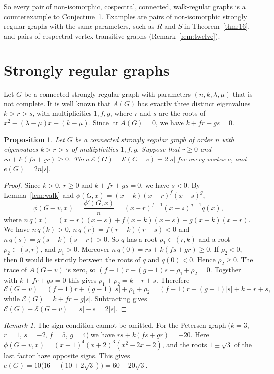 \documentclass[11pt]{amsart}
\newtheorem{proposition}[theorem]{Proposition}
\theoremstyle{remark}
\newtheorem{remark}[theorem]{Remark}
\newcommand{\cE}{\mathcal{E}}
\DeclareMathOperator{\tr}{tr}
\begin{document}
So every pair of non-isomorphic, cospectral, connected, walk-regular graphs is a counterexample to Conjecture~1.
Examples are pairs of non-isomorphic strongly regular graphs with the same parameters, such as $R$ and $S$ in Theorem~\ref{thm:16}, and pairs of cospectral vertex-transitive graphs (Remark~\ref{rem:twelve}).

\section{Strongly regular graphs}\label{sec:srg}

Let $G$ be a connected strongly regular graph with parameters $(n,k,\lambda,\mu)$ that is not complete.
It is well known that $A(G)$ has exactly three distinct eigenvalues $k>r>s$, with multiplicities $1,f,g$, where $r$ and $s$ are the roots of $x^2-(\lambda-\mu)x-(k-\mu)$.
Since $\tr A(G)=0$, we have $k+fr+gs=0$.

\begin{proposition}\label{prop:srg}
Let $G$ be a connected strongly regular graph of order $n$ with eigenvalues $k>r>s$ of multiplicities $1,f,g$.
Suppose that $r\ge0$ and $rs+k(fs+gr)\ge0$.
Then $\cE(G)-\cE(G-v)=2|s|$ for every vertex $v$, and $e(G)=2n|s|$.
\end{proposition}

\begin{proof}
Since $k>0$, $r\ge0$ and $k+fr+gs=0$, we have $s<0$.
By Lemma~\ref{lem:walk} and $\phi(G,x)=(x-k)(x-r)^f(x-s)^g$,
\[
\phi(G-v,x)=\frac{\phi'(G,x)}{n}=(x-r)^{f-1}(x-s)^{g-1}q(x),
\]
where $n\,q(x)=(x-r)(x-s)+f(x-k)(x-s)+g(x-k)(x-r)$.
We have $n\,q(k)>0$, $n\,q(r)=f(r-k)(r-s)<0$ and $n\,q(s)=g(s-k)(s-r)>0$.
So $q$ has a root $\rho_1\in(r,k)$ and a root $\rho_2\in(s,r)$, and $\rho_1>0$.
Moreover $n\,q(0)=rs+k(fs+gr)\ge0$.
If $\rho_2<0$, then $0$ would lie strictly between the roots of $q$ and $q(0)<0$.
Hence $\rho_2\ge0$.
The trace of $A(G-v)$ is zero, so $(f-1)r+(g-1)s+\rho_1+\rho_2=0$.
Together with $k+fr+gs=0$ this gives $\rho_1+\rho_2=k+r+s$.
Therefore
\[
\cE(G-v)=(f-1)r+(g-1)|s|+\rho_1+\rho_2=(f-1)r+(g-1)|s|+k+r+s,
\]
while $\cE(G)=k+fr+g|s|$.
Subtracting gives $\cE(G)-\cE(G-v)=|s|-s=2|s|$.
\end{proof}

\begin{remark}
The sign condition cannot be omitted.
For the Petersen graph ($k=3$, $r=1$, $s=-2$, $f=5$, $g=4$) we have $rs+k(fs+gr)=-20$.
Here $\phi(G-v,x)=(x-1)^4(x+2)^3(x^2-2x-2)$, and the roots $1\pm\sqrt3$ of the last factor have opposite signs.
This gives $e(G)=10\bigl(16-(10+2\sqrt3)\bigr)=60-20\sqrt3$.
\end{remark}
\end{document}
